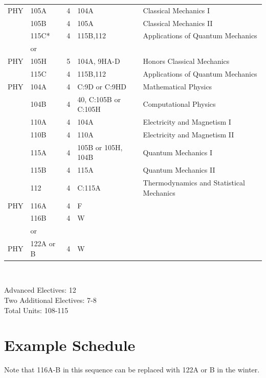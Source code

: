 \documentclass[12pt]{article}
\begin{document}
\noindent
\begin{tabular}{|lllll|}
\hline
PHY & 105A & 4 &  104A & Classical Mechanics I\\
    & 105B & 4 &  105A & Classical Mechanics II\\ 
    & 115C*& 4 &  115B,112 & Applications of Quantum Mechanics\\ 

\hline
    & or & & & \\
\hline
PHY & 105H & 5 &  104A, 9HA-D & Honors Classical Mechanics\\  
    & 115C & 4 &  115B,112 & Applications of Quantum Mechanics\\ 
\hline
\hline
PHY & 104A & 4 & C:9D or C:9HD & Mathematical Physics \\ 
    & 104B & 4 & 40, C:105B or C:105H& Computational Physics\\
    & 110A & 4 & 104A & Electricity and Magnetism I\\
    & 110B & 4 & 110A&  Electricity and Magnetism II\\
    & 115A & 4 & 105B or 105H, 104B & Quantum Mechanics I \\
    & 115B & 4 & 115A & Quantum Mechanics II \\
    & 112  & 4 & C:115A & Thermodynamics and Statistical Mechanics\\    
\hline
\hline
PHY & 116A & 4 &  F\\
    & 116B & 4 &  W \\ 
\hline
    & or & & \\
\hline
PHY & 122A or B & 4 & W\\  
\hline
\end{tabular}\\ \vskip 0.25cm


\noindent
Advanced Electives: 12
\\
\noindent
Two Additional Electives: 7-8 
\\
\noindent
Total Units: 108-115 
\newpage
\onecolumn

\section{Example Schedule}

Note that 116A-B in this sequence can be replaced with 122A or B in the winter.
\end{document}
